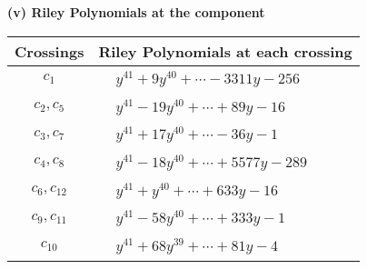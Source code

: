 \documentclass[1p]{elsarticle_modified}
\theoremstyle{definition}
\begin{document}
\flushleft \textbf{(v) Riley Polynomials at the component}\newline \\
\begin{tabular}{m{50pt}|m{274pt}}
Crossings & \hspace{64pt}Riley Polynomials at each crossing \\
\hline $$\begin{aligned}c_{1}\end{aligned}$$&$\begin{aligned}
&y^{41}+9 y^{40}+\cdots-3311 y-256
\end{aligned}$\\
\hline $$\begin{aligned}c_{2},c_{5}\end{aligned}$$&$\begin{aligned}
&y^{41}-19 y^{40}+\cdots+89 y-16
\end{aligned}$\\
\hline $$\begin{aligned}c_{3},c_{7}\end{aligned}$$&$\begin{aligned}
&y^{41}+17 y^{40}+\cdots-36 y-1
\end{aligned}$\\
\hline $$\begin{aligned}c_{4},c_{8}\end{aligned}$$&$\begin{aligned}
&y^{41}-18 y^{40}+\cdots+5577 y-289
\end{aligned}$\\
\hline $$\begin{aligned}c_{6},c_{12}\end{aligned}$$&$\begin{aligned}
&y^{41}+y^{40}+\cdots+633 y-16
\end{aligned}$\\
\hline $$\begin{aligned}c_{9},c_{11}\end{aligned}$$&$\begin{aligned}
&y^{41}-58 y^{40}+\cdots+333 y-1
\end{aligned}$\\
\hline $$\begin{aligned}c_{10}\end{aligned}$$&$\begin{aligned}
&y^{41}+68 y^{39}+\cdots+81 y-4
\end{aligned}$\\
\hline
\end{tabular}\\~\\
\end{document}
